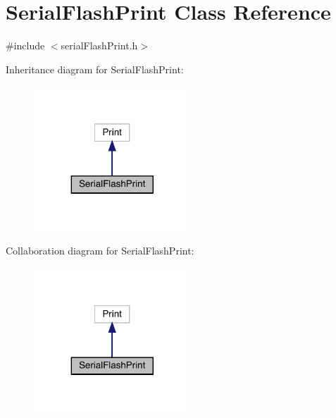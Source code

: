 \hypertarget{class_serial_flash_print}{}\section{Serial\+Flash\+Print Class Reference}
\label{class_serial_flash_print}


{\ttfamily \#include $<$serial\+Flash\+Print.\+h$>$}



Inheritance diagram for Serial\+Flash\+Print\+:\nopagebreak
\begin{figure}[H]
\begin{center}
\leavevmode
\includegraphics[width=167pt]{class_serial_flash_print__inherit__graph}
\end{center}
\end{figure}


Collaboration diagram for Serial\+Flash\+Print\+:\nopagebreak
\begin{figure}[H]
\begin{center}
\leavevmode
\includegraphics[width=167pt]{class_serial_flash_print__coll__graph}
\end{center}
\end{figure}
